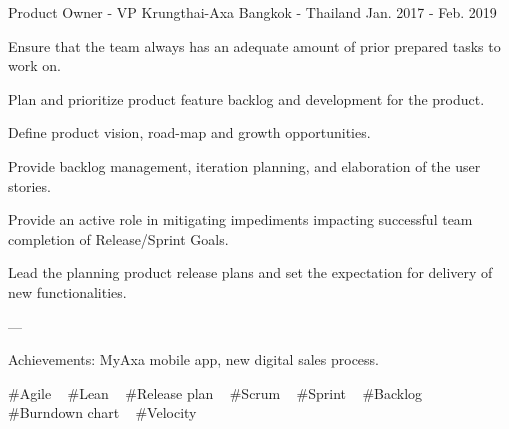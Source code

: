 \begin{cventries}
  \cventry
    {Product Owner - VP} %
    {Krungthai-Axa} %
    {Bangkok - Thailand} %
    {Jan. 2017 - Feb. 2019} %
    {
      \begin{cvitems} %
        \item {Ensure that the team always has an adequate amount of prior prepared tasks to work on.}
        \item {Plan and prioritize product feature backlog and development for the product.}
        \item {Define product vision, road-map and growth opportunities.}
        \item {Provide backlog management, iteration planning, and elaboration of the user stories.}
        \item {Provide an active role in mitigating impediments impacting successful team completion of Release/Sprint Goals.}
        \item {Lead the planning product release plans and set the expectation for delivery of new functionalities.}
        \item {---}
        \item {Achievements: MyAxa mobile app, new digital sales process.}
      \end{cvitems}
    }
    {
      \#Agile ~
      \#Lean ~
      \#Release plan ~
      \#Scrum ~
      \#Sprint ~
      \#Backlog ~
      \#Burndown chart ~
      \#Velocity ~
    }


\end{cventries}
